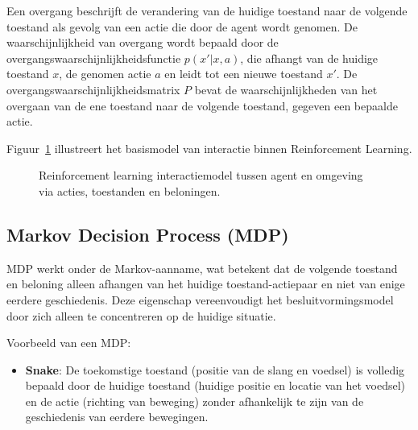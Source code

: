 \documentclass[a4paper,12pt]{article}
\begin{document}
Een overgang beschrijft de verandering van de huidige toestand naar de volgende
toestand als gevolg van een actie die door de agent wordt genomen. De
waarschijnlijkheid van overgang wordt bepaald door de
overgangswaarschijnlijkheidsfunctie \( p(x'|x, a) \), die afhangt van de
huidige toestand \( x \), de genomen actie \( a \) en leidt tot een nieuwe
toestand \( x' \). De overgangswaarschijnlijkheidsmatrix \( P \) bevat de
waarschijnlijkheden van het overgaan van de ene toestand naar de volgende
toestand, gegeven een bepaalde actie.

Figuur~\ref{fig:rl_model} illustreert het basismodel van interactie binnen
Reinforcement Learning.
\begin{figure}[h]
    \caption{Reinforcement learning interactiemodel tussen agent en omgeving via acties, toestanden en beloningen.}
    \label{fig:rl_model}
\end{figure}
\subsection{Markov Decision Process (MDP)}

MDP werkt onder de Markov-aanname, wat betekent dat de volgende toestand en
beloning alleen afhangen van het huidige toestand-actiepaar en niet van enige
eerdere geschiedenis. Deze eigenschap vereenvoudigt het besluitvormingsmodel
door zich alleen te concentreren op de huidige situatie.

Voorbeeld van een MDP:
\begin{itemize}
    \item \textbf{Snake}: De toekomstige toestand (positie van de slang en voedsel) is volledig bepaald door de huidige toestand (huidige positie en locatie van het voedsel) en de actie (richting van beweging) zonder afhankelijk te zijn van de geschiedenis van eerdere bewegingen.
\end{itemize}
\end{document}
